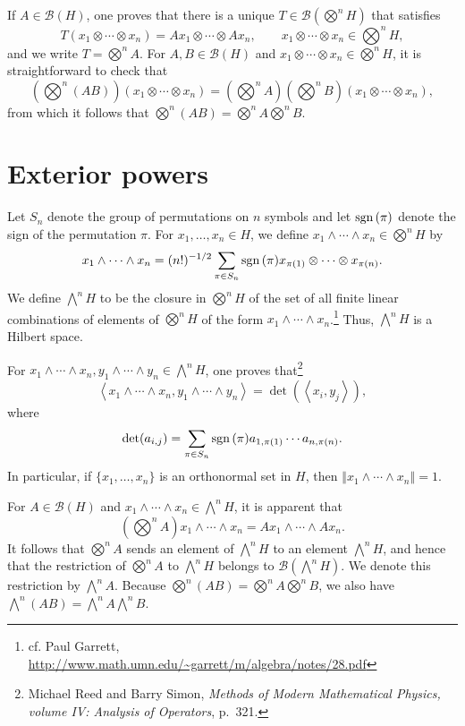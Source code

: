 \documentclass{article}
\newcommand{\inner}[2]{\left\langle #1, #2 \right\rangle}
\newcommand{\sgn}{\ensuremath\mathrm{sgn}\,}
\newcommand{\norm}[1]{\left\Vert #1 \right\Vert}
\theoremstyle{definition}
\begin{document}
If $A \in \mathscr{B}(H)$, one proves that there is a unique $T \in \mathscr{B}(\bigotimes^n H)$ that satisfies
\[
T(x_1 \otimes \cdots \otimes x_n)=Ax_1 \otimes \cdots \otimes Ax_n, \qquad
x_1\otimes \cdots \otimes x_n \in \textstyle{\bigotimes^n H},
\]
and we write $T=\bigotimes^n A$. For $A,B \in \mathscr{B}(H)$
and $x_1 \otimes \cdots \otimes x_n \in \bigotimes^n H$,
it is straightforward to check that 
\[
\textstyle{(\bigotimes^n (AB))(x_1 \otimes \cdots \otimes x_n) = (\bigotimes^n A)(\bigotimes^n B)(x_1 \otimes \cdots \otimes x_n)},
\]
from which it follows that $\bigotimes^n (AB) = \bigotimes^n A \bigotimes^n B$.

\section{Exterior powers}
Let $S_n$ denote the group of permutations on $n$ symbols and let $\sgn(\pi)$ denote the sign of the permutation $\pi$. 
For $x_1,\ldots,x_n \in H$, we define $x_1 \wedge \cdots \wedge x_n \in \bigotimes^n H$ by
\[
x_1 \wedge \cdots \wedge x_n = (n!)^{-1/2} \sum_{\pi \in S_n} \sgn(\pi) x_{\pi(1)} \otimes \cdots \otimes x_{\pi(n)}.
\]
We define $\bigwedge^n H$ to be the closure in $\bigotimes^n H$ of the set
of all finite linear combinations of elements of $\bigotimes^n H$ of the form $x_1 \wedge \cdots \wedge x_n$.\footnote{cf. Paul Garrett, \url{http://www.math.umn.edu/~garrett/m/algebra/notes/28.pdf}}
Thus, $\bigwedge^n H$ is a Hilbert space.

For $x_1 \wedge \cdots \wedge x_n, y_1 \wedge \cdots \wedge y_n \in \bigwedge^n H$, one proves that\footnote{Michael
Reed and Barry Simon, {\em Methods of Modern Mathematical Physics, volume IV: Analysis of Operators}, p.~321.}
\[
\inner{x_1 \wedge \cdots \wedge x_n}{y_1 \wedge \cdots \wedge y_n}= \det(\inner{x_i}{y_j}),
\]
where
\[
\det(a_{i,j}) = \sum_{\pi \in S_n} \sgn(\pi) a_{1,\pi(1)} \cdots a_{n,\pi(n)}.
\]
In particular,
if $\{x_1,\ldots,x_n\}$ is an orthonormal set in $H$, then $\norm{x_1 \wedge \cdots \wedge x_n}=1$.


For $A \in \mathscr{B}(H)$ and $x_1 \wedge \cdots \wedge x_n \in \bigwedge^n H$, it is apparent that
\[
\textstyle{(\bigotimes^n A)x_1 \wedge \cdots \wedge x_n = Ax_1 \wedge \cdots \wedge Ax_n.}
\]
 It follows that $\bigotimes^n A$ sends
an element of $\bigwedge^n H$ to an element $\bigwedge^n H$, and hence that the restriction of $\bigotimes^n A$ to
$\bigwedge^n H$ belongs to $\mathscr{B}(\bigwedge^n H)$. We denote this restriction by $\bigwedge^n A$. 
Because $\bigotimes^n (AB) = \bigotimes^n A \bigotimes^n B$, we also have
$\bigwedge^n (AB) = \bigwedge^n A \bigwedge^n B$. 
\end{document}
